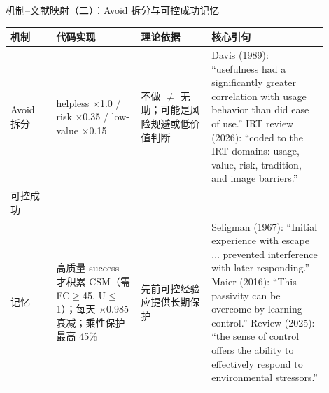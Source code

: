 \documentclass[aspectratio=169]{beamer}
\begin{document}
\begin{frame}[t]{机制--文献映射（二）：Avoid 拆分与可控成功记忆}
\scriptsize
\setlength{\tabcolsep}{2.5pt}
\renewcommand{\arraystretch}{1.15}
\centering
\begin{tabular}{
    L{0.13\linewidth}
    L{0.24\linewidth}
    L{0.20\linewidth}
    L{0.33\linewidth}
}
\toprule
\textbf{机制} & \textbf{代码实现} & \textbf{理论依据} & \textbf{核心引句} \\
\midrule
Avoid 拆分
&
helpless $\times$1.0 / risk $\times$0.35 / low-value $\times$0.15
&
不做 $\neq$ 无助；可能是风险规避或低价值判断
&
Davis (1989): ``usefulness had a significantly greater correlation with usage behavior than did ease of use.'' \newline
IRT review (2026): ``coded to the IRT domains: usage, value, risk, tradition, and image barriers.'' \\

\midrule
可控成功\\记忆
&
高质量 success 才积累 CSM（需 FC$\geq$45, U$\leq$1）；每天 $\times$0.985 衰减；乘性保护最高 45\%
&
先前可控经验应提供长期保护
&
Seligman (1967): ``Initial experience with escape ... prevented interference with later responding.'' \newline
Maier (2016): ``This passivity can be overcome by learning control.'' \newline
Review (2025): ``the sense of control offers the ability to effectively respond to environmental stressors.'' \\
\bottomrule
\end{tabular}
\end{frame}
\end{document}

